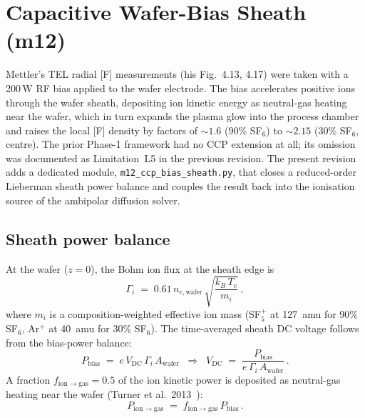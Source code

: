 \section{Capacitive Wafer-Bias Sheath (m12)}
\label{sec:m12-bias-sheath}

Mettler's TEL radial [F] measurements (his Fig.~4.13, 4.17) were taken
with a 200\,W RF bias applied to the wafer electrode.  The bias
accelerates positive ions through the wafer sheath, depositing ion
kinetic energy as neutral-gas heating near the wafer, which in turn
expands the plasma glow into the process chamber and raises the local
[F] density by factors of $\sim 1.6$ (90\% SF$_6$) to $\sim 2.15$ (30\%
SF$_6$, centre).  The prior Phase-1 framework had no CCP extension at
all; its omission was documented as Limitation~L5 in the previous
revision.  The present revision adds a dedicated module,
\texttt{m12\_ccp\_bias\_sheath.py}, that closes a reduced-order
Lieberman sheath power balance and couples the result back into the
ionisation source of the ambipolar diffusion solver.

\subsection*{Sheath power balance}

At the wafer ($z=0$), the Bohm ion flux at the sheath edge is
\begin{equation}
  \Gamma_i \;=\; 0.61\,n_{e,\mathrm{wafer}}\,\sqrt{\frac{k_B\,T_e}{m_i}}\,,
  \label{eq:bohm-flux}
\end{equation}
where $m_i$ is a composition-weighted effective ion mass (SF$_5^+$ at
127~amu for 90\% SF$_6$, Ar$^+$ at 40~amu for 30\% SF$_6$).  The
time-averaged sheath DC voltage follows from the bias-power balance:
\begin{equation}
  P_\mathrm{bias} \;=\; e\,V_\mathrm{DC}\,\Gamma_i\,A_\mathrm{wafer}
  \;\;\Rightarrow\;\;
  V_\mathrm{DC} \;=\; \frac{P_\mathrm{bias}}{e\,\Gamma_i\,A_\mathrm{wafer}}\,.
  \label{eq:sheath-Vdc}
\end{equation}
A fraction $f_\mathrm{ion\to gas} = 0.5$ of the ion kinetic power is
deposited as neutral-gas heating near the wafer
(Turner et al.\ 2013~\cite{Turner2013}):
\begin{equation}
  P_\mathrm{ion\to gas} \;=\; f_\mathrm{ion\to gas}\,P_\mathrm{bias}\,.
  \label{eq:ion-to-gas}
\end{equation}

